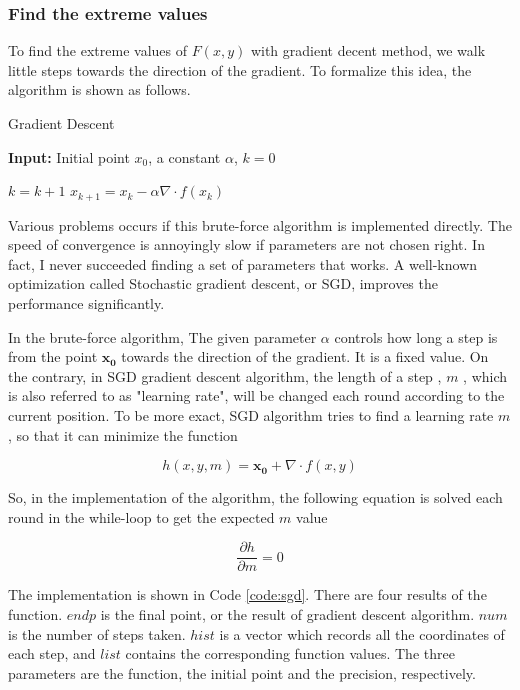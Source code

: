 \documentclass[12pt]{article}
\begin{document}
\subsubsection{Find the extreme values}
To find the extreme values of $F(x,y)$ with gradient decent method, we walk little steps towards the direction of the gradient. To formalize this idea, the algorithm is shown as follows.

\begin{algorithm}
	\caption{Gradient Descent}
	\hspace*{0.02in} {\bf Input:}
	Initial point $x_0$, a constant $\alpha$, $k=0$
	\begin{algorithmic}
	\State $k=k+1$
	\State $x_{k+1}=x_k-\alpha \nabla \cdot f(x_k)$
	
	\EndWhile
	\end{algorithmic}
\end{algorithm}

Various problems occurs if this brute-force algorithm is implemented directly. The speed of convergence is annoyingly slow if parameters are not chosen right. In fact, I never succeeded finding a set of parameters that works. A well-known optimization  called Stochastic gradient descent, or SGD, improves the performance significantly.

In the brute-force algorithm, The given parameter $\alpha$ controls how long a step is from the point $\mathbf{x_0}$ towards the direction of the gradient. It is a fixed value. On the contrary, in SGD gradient descent algorithm, the length of a step , $m$ , which is also referred to as "learning rate", will be changed each round according to the current position. To be more exact, SGD algorithm tries to find a learning rate $m$, so that it can minimize the function

\begin{equation}
	h(x,y,m) = \mathbf{x_0} + \nabla \cdot f(x,y)
\end{equation}

So, in the implementation of the algorithm, the following equation is solved each round in the while-loop to get the expected $m$ value

\begin{equation}
	\frac{\partial h}{\partial m} = 0
\end{equation}

The implementation is shown in Code \ref{code:sgd}. There are four results of the function. $endp$ is the final point, or the result of gradient descent algorithm. $num$ is the number of steps taken. $hist$ is a vector which records all the coordinates of each step, and $list$ contains the corresponding function values. The three parameters are the function, the initial point and the precision, respectively.
\end{document}
